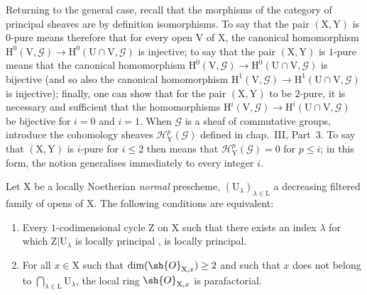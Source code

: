 \begin{remark}[21.13.13]
Returning to the general case, recall that the morphisms of the category of principal sheaves are by definition isomorphisms.
To say that the pair $(\mathrm{X},\mathrm{Y})$ is $0$-pure means therefore that for every open $\mathrm{V}$ of $\mathrm{X}$, the canonical homomorphism $\mathrm{H}^0(\mathrm{V},\mathscr{G})\to\mathrm{H}^0(\mathrm{U}\cap\mathrm{V},\mathscr{G})$ is injective; to say that the pair $(\mathrm{X},\mathrm{Y})$ is $1$-pure means that the canonical homomorphism $\mathrm{H}^0(\mathrm{V},\mathscr{G})\to\mathrm{H}^0(\mathrm{U}\cap\mathrm{V},\mathscr{G})$ is bijective (and so also the canonical homomorphism $\mathrm{H}^1(\mathrm{V},\mathscr{G})\to\mathrm{H}^1(\mathrm{U}\cap\mathrm{V},\mathscr{G})$ is injective); finally, one can show that for the pair $(\mathrm{X},\mathrm{Y})$ to be $2$-pure, it is necessary and sufficient that the homomorphisms $\mathrm{H}^i(\mathrm{V},\mathscr{G})\to\mathrm{H}^i(\mathrm{U}\cap\mathrm{V},\mathscr{G})$ be bijective for $i=0$ and $i=1$.
When $\mathscr{G}$ is a sheaf of commutative groups, introduce the cohomology sheaves $\mathscr{H}^p_{\mathrm{Y}}(\mathscr{G})$ defined in chap.~III, Part~3. To say that $(\mathrm{X},\mathrm{Y})$ is $i$-pure for $i\leq2$ then means that $\mathscr{H}^p_{\mathrm{Y}}(\mathscr{G})=0$ for $p\leq i$; in this form, the notion generalises immediately to every integer $i$.
\end{remark}

\begin{proposition}[21.13.14]
\label{IV.21.13.14}
Let $\mathrm{X}$ be a locally Noetherian \emph{normal} prescheme, $(\mathrm{U}_\lambda)_{\lambda\in\mathrm{L}}$ a decreasing filtered family of opens of $\mathrm{X}$.
The following conditions are equivalent:
\begin{enumerate}[label=\emph{\alph*)}]
  \item Every $1$-codimensional cycle $\mathrm{Z}$ on $\mathrm{X}$ such that there exists an index $\lambda$ for which $\mathrm{Z}|\mathrm{U}_\lambda$ is locally principal , is locally principal.
  \item For all $x\in\mathrm{X}$ such that $\dim(\sh{O}_{\mathrm{X},x})\geq 2$ and such that $x$ does not belong to $\bigcap_{\lambda\in\mathrm{L}}\mathrm{U}_\lambda$, the local ring $\sh{O}_{\mathrm{X},x}$ is parafactorial.
\end{enumerate}
\end{proposition}

